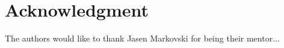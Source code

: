\section*{Acknowledgment}


The authors would like to thank Jasen Markovski for being their mentor...